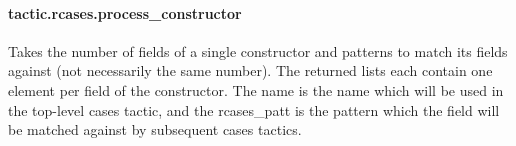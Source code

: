 \documentclass{article}
\begin{document}
\paragraph{tactic.rcases.process\_constructor}
\par
Takes the number of fields of a single constructor and patterns to
match its fields against (not necessarily the same number). The
returned lists each contain one element per field of the
constructor. The 
\colorbox[RGB]{253,246,227}{{{{\color[RGB]{101, 123, 131} name }}}} is the name which will be used in the
top-level 
\colorbox[RGB]{253,246,227}{{{{\color[RGB]{101, 123, 131} cases }}}} tactic, and the 
\colorbox[RGB]{253,246,227}{{{{\color[RGB]{101, 123, 131} rcases\_patt }}}} is the pattern which
the field will be matched against by subsequent 
\colorbox[RGB]{253,246,227}{{{{\color[RGB]{101, 123, 131} cases }}}} tactics.
\end{document}
